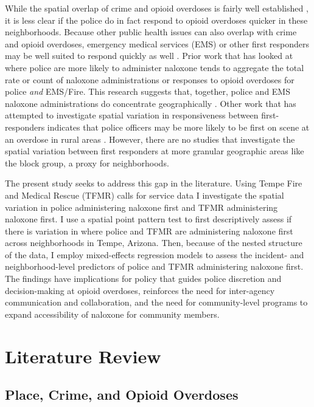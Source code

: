While the spatial overlap of crime and opioid overdoses is fairly well established \parencite{carter_spatial_2019, magee_dual_2022, rosenfeld_opioid_2021}, it is less clear if the police do in fact respond to opioid overdoses quicker in these neighborhoods. Because other public health issues can also overlap with crime and opioid overdoses, emergency medical services (EMS) or other first responders may be well suited to respond quickly as well \parencite{clair_being_2020}. Prior work that has looked at where police are more likely to administer naloxone tends to aggregate the total rate or count of naloxone administrations or responses to opioid overdoses for police \textit{and} EMS/Fire. This research suggests that, together, police and EMS naloxone administrations do concentrate geographically \parencite{heavey_descriptive_2018}. Other work that has attempted to investigate spatial variation in responsiveness between first-responders indicates that police officers may be more likely to be first on scene at an overdose in rural areas \parencite{wood_overdose_2021}. However, there are no studies that investigate the spatial variation between first responders at more granular geographic areas like the block group, a proxy for neighborhoods. 

The present study seeks to address this gap in the literature. Using Tempe Fire and Medical Rescue (TFMR) calls for service data I investigate the spatial variation in police administering naloxone first and TFMR administering naloxone first. I use a spatial point pattern test to first descriptively assess if there is variation in where police and TFMR are administering naloxone first across neighborhoods in Tempe, Arizona. Then, because of the nested structure of the data, I employ mixed-effects regression models to assess the incident- and neighborhood-level predictors of police and TFMR administering naloxone first. The findings have implications for policy that guides police discretion and decision-making at opioid overdoses, reinforces the need for inter-agency communication and collaboration, and the need for community-level programs to expand accessibility of naloxone for community members.

\section{\centering Literature Review}

\subsection{Place, Crime, and Opioid Overdoses}

